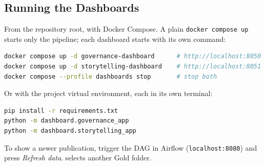 \documentclass[a4paper,11pt,oneside]{book}
\begin{document}
    \begin{appendices}

\chapter{Running the Dashboards}
From the repository root, with Docker Compose. A plain \texttt{docker compose up} starts only the pipeline; each dashboard starts with its own command:
\begin{lstlisting}[language=bash,numbers=none]
docker compose up -d governance-dashboard      # http://localhost:8050
docker compose up -d storytelling-dashboard    # http://localhost:8051
docker compose --profile dashboards stop       # stop both
\end{lstlisting}

Or with the project virtual environment, each in its own terminal:
\begin{lstlisting}[language=bash,numbers=none]
pip install -r requirements.txt
python -m dashboard.governance_app
python -m dashboard.storytelling_app
\end{lstlisting}

To show a newer publication, trigger the  DAG in Airflow (\texttt{localhost:8080}) and press \emph{Refresh data}.  selects another Gold folder.

    \end{appendices}
\end{document}

